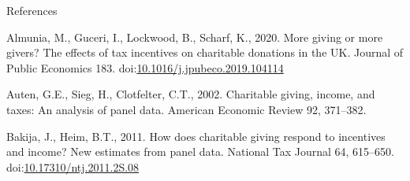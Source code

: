 \documentclass[
  ignorenonframetext,
  aspectratio=169,
]{beamer}
\newlength{\cslhangindent}
\newlength{\cslentryspacingunit} %
\newenvironment{CSLReferences}[2] %
 {%
  \setlength{\parindent}{0pt}
  \ifodd #1
  \let\oldpar\par
  \def\par{\hangindent=\cslhangindent\oldpar}
  \fi
  \setlength{\parskip}{#2\cslentryspacingunit}
 }%
 {}
\begin{document}
\begin{frame}{References}
\protect\hypertarget{references}{}
\hypertarget{refs}{}
\begin{CSLReferences}{1}{0}
\leavevmode{}%
Almunia, M., Guceri, I., Lockwood, B., Scharf, K., 2020. More giving or more givers? The effects of tax incentives on charitable donations in the UK. Journal of Public Economics 183. doi:\href{https://doi.org/10.1016/j.jpubeco.2019.104114}{10.1016/j.jpubeco.2019.104114}

\leavevmode{}%
Auten, G.E., Sieg, H., Clotfelter, C.T., 2002. Charitable giving, income, and taxes: An analysis of panel data. American Economic Review 92, 371--382.

\leavevmode{}%
Bakija, J., Heim, B.T., 2011. How does charitable giving respond to incentives and income? New estimates from panel data. National Tax Journal 64, 615--650. doi:\href{https://doi.org/10.17310/ntj.2011.2S.08}{10.17310/ntj.2011.2S.08}

\end{CSLReferences}
\end{frame}
\end{document}
